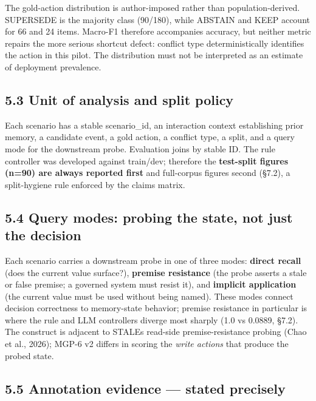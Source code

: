 The gold-action distribution is author-imposed rather than
population-derived. SUPERSEDE is the majority class (90/180), while
ABSTAIN and KEEP account for 66 and 24 items. Macro-F1 therefore
accompanies accuracy, but neither metric repairs the more serious
shortcut defect: conflict type deterministically identifies the action
in this pilot. The distribution must not be interpreted as an estimate
of deployment prevalence.

\subsection{5.3 Unit of analysis and split
policy}\label{unit-of-analysis-and-split-policy}

Each scenario has a stable scenario\_id, an interaction context
establishing prior memory, a candidate event, a gold action, a conflict
type, a split, and a query mode for the downstream probe. Evaluation
joins by stable ID. The rule controller was developed against train/dev;
therefore the \textbf{test-split figures (n=90) are always reported
first} and full-corpus figures second (§7.2), a split-hygiene rule
enforced by the claims matrix.

\subsection{5.4 Query modes: probing the state, not just the
decision}\label{query-modes-probing-the-state-not-just-the-decision}

Each scenario carries a downstream probe in one of three modes:
\textbf{direct recall} (does the current value surface?),
\textbf{premise resistance} (the probe asserts a stale or false premise;
a governed system must resist it), and \textbf{implicit application}
(the current value must be used without being named). These modes
connect decision correctness to memory-state behavior; premise
resistance in particular is where the rule and LLM controllers diverge
most sharply (1.0 vs 0.0889, §7.2). The construct is adjacent to
STALE\textquotesingle s read-side premise-resistance probing (Chao et
al., 2026); MGP-6 v2 differs in scoring the \emph{write actions} that
produce the probed state.

\subsection{5.5 Annotation evidence --- stated
precisely}\label{annotation-evidence-stated-precisely}


